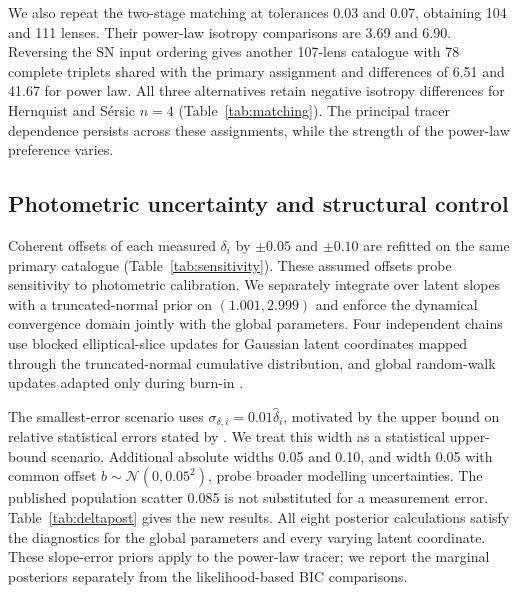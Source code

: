 \documentclass{aa}
\begin{document}
We also repeat the two-stage matching at tolerances 0.03 and 0.07, obtaining 104 and 111 lenses. Their power-law isotropy comparisons are 3.69 and 6.90. Reversing the SN input ordering gives another 107-lens catalogue with 78 complete triplets shared with the primary assignment and differences of 6.51 and 41.67 for power law. All three alternatives retain negative isotropy differences for Hernquist and S\'ersic $n=4$ (Table~\ref{tab:matching}). The principal tracer dependence persists across these assignments, while the strength of the power-law preference varies.
\subsection{Photometric uncertainty and structural control}\label{sec:otherchecks}
Coherent offsets of each measured $\delta_i$ by $\pm0.05$ and $\pm0.10$ are refitted on the same primary catalogue (Table~\ref{tab:sensitivity}). These assumed offsets probe sensitivity to photometric calibration. We separately integrate over latent slopes with a truncated-normal prior on $(1.001,2.999)$ and enforce the dynamical convergence domain jointly with the global parameters. Four independent chains use blocked elliptical-slice updates for Gaussian latent coordinates mapped through the truncated-normal cumulative distribution, and global random-walk updates adapted only during burn-in \citep{Murray2010}.

The smallest-error scenario uses $\sigma_{\delta,i}=0.01\widehat\delta_i$, motivated by the upper bound on relative statistical errors stated by \citet{stz1902}. We treat this width as a statistical upper-bound scenario. Additional absolute widths 0.05 and 0.10, and width 0.05 with common offset $b\sim\mathcal N(0,0.05^2)$, probe broader modelling uncertainties. The published population scatter 0.085 is not substituted for a measurement error. Table~\ref{tab:deltapost} gives the new results. All eight posterior calculations satisfy the diagnostics for the global parameters and every varying latent coordinate. These slope-error priors apply to the power-law tracer; we report the marginal posteriors separately from the likelihood-based BIC comparisons.
\begin{table}[t]\centering\small\caption{Power-law posterior sensitivity to slope-error scenarios. Entries are medians and central 68\% intervals. The relative-1\% row is a statistical upper-bound scenario; the other widths are assumed sensitivity inputs.}\label{tab:deltapost}\end{table}

\end{document}
